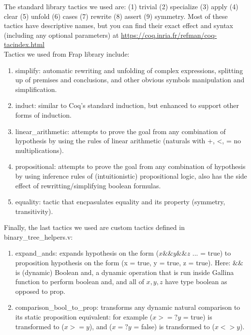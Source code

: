 \documentclass{article}
\begin{document}
The standard library tactics we used are: (1) trivial (2) specialize (3) apply (4) clear (5) unfold (6) cases (7) rewrite (8) assert (9) symmetry. Most of these tactics have descriptive names, but you can find their exact effect and syntax (including any optional parameters) at \href{https://coq.inria.fr/refman/coq-tacindex.html}{https://coq.inria.fr/refman/coq-tacindex.html} \\

Tactics we used from Frap library include:
\begin{enumerate}
    \item simplify: automatic rewriting and unfolding of complex expressions, splitting up of premises and conclusions, and other obvious symbols
                     manipulation and simplification.
    \item induct: similar to Coq's standard induction, but enhanced to support other forms of induction.
    \item linear\_arithmetic: attempts to prove the goal from any combination of hypothesis by using the rules of linear arithmetic (naturals with +, <, = no multiplications).
    \item propositional: attempts to prove the goal from any combination of hypothesis by using inference rules of (intuitionistic) propositional logic, also has the side effect
                         of rewritting/simplifying boolean formulas.
    \item equality: tactic that encpasulates equality and its property (symmetry, transitivity). \\
\end{enumerate}

Finally, the last tactics we used are custom tactics defined in binary\_tree\_helpers.v:
\begin{enumerate}
    \item expand\_ands: expands hypothesis on the form ($x \&\& y \&\& z$ ... = true) to proposition hypothesis on the form (x = true, y = true, z = true). Here: $\&\&$ is (dynamic) Boolean and, a dynamic operation that is run inside Gallina function to perform boolean and, and all of $x, y, z$ have type boolean as opposed to prop.
    \item comparison\_bool\_to\_prop: transforms any dynamic natural comparison to its static proposition equivalent: for example ($x >=? y$ = true) is transformed to ($x >= y$), and ($x =? y$ = false) is transformed to ($x <> y$).
\end{enumerate}
\end{document}

